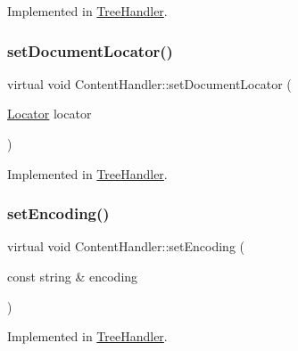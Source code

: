 Implemented in \mbox{\hyperlink{class_tree_handler_aca0bd5378ea9bc32f218b47be7202b00}{Tree\+Handler}}.

\mbox{\label{class_content_handler_aceaa6046b41a125ee4718fdbb009b859}} 
\subsubsection{\texorpdfstring{setDocumentLocator()}{setDocumentLocator()}}
{\footnotesize\ttfamily virtual void Content\+Handler\+::set\+Document\+Locator (\begin{DoxyParamCaption}\item[{\mbox{\hyperlink{xml_8hh_ad34bc338f5e298a1993320898263b741}{Locator}}}]{locator }\end{DoxyParamCaption})\hspace{0.3cm}{\ttfamily [pure virtual]}}



Implemented in \mbox{\hyperlink{class_tree_handler_af72fb7d4af5500674084e45076b261af}{Tree\+Handler}}.

\mbox{\label{class_content_handler_ae8ed0998c2723da7740738811573542e}} 
\subsubsection{\texorpdfstring{setEncoding()}{setEncoding()}}
{\footnotesize\ttfamily virtual void Content\+Handler\+::set\+Encoding (\begin{DoxyParamCaption}\item[{const string \&}]{encoding }\end{DoxyParamCaption})\hspace{0.3cm}{\ttfamily [pure virtual]}}



Implemented in \mbox{\hyperlink{class_tree_handler_a9cd7a58c26881b5301d6f0b04f9a1c7f}{Tree\+Handler}}.

\mbox{\label{class_content_handler_aec6be0bfc55eda76da189b718a92d3a9}} 
